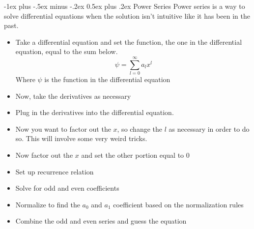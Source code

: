 \documentclass[10pt,landscape]{article}
\makeatletter
\renewcommand{\section}{\@startsection{section}{1}{0mm}%
                                {-1ex plus -.5ex minus -.2ex}%
                                {0.5ex plus .2ex}%
                                {\normalfont\large\bfseries}}
\makeatother
\begin{document}
\begin{multicols}{3}
\section{Power Series}
Power series is a way to solve differential equations when the solution isn't intuitive like it has been in the past. 
\begin{itemize}
    \item Take a differential equation and set the function, the one in the differential equation, equal to the sum below. 
    \begin{equation*}
    \psi=\sum_{l=0}^\infty  a_lx^l  
    \end{equation*}{}
    Where $\psi$ is the function in the differential equation
    \item Now, take the derivatives as necessary
    \item Plug in the derivatives into the differential equation.
    \item Now you want to factor out the $x$, so change the $l$ as necessary in order to do so. This will involve some very weird tricks.
    \item Now factor out the $x$ and set the other portion equal to $0$
    \item Set up recurrence relation
    \item Solve for odd and even coefficients
    \item Normalize to find the $a_0$ and $a_1$ coefficient based on the normalization rules
    \item Combine the odd and even series and guess the equation
\end{itemize}

\end{multicols}
\end{document}
